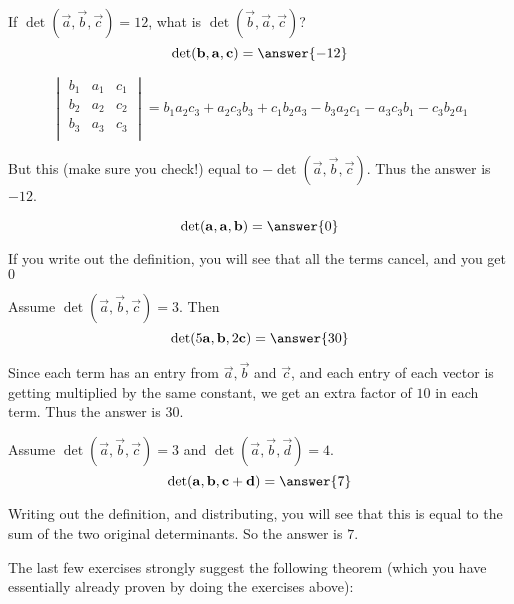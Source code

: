 \documentclass{ximera}
\begin{document}
\begin{question}
  If $\det(\vec{a},\vec{b},\vec{c}) = 12$, what is
  $\det(\vec{b},\vec{a},\vec{c})$?
  \[
  \det(\vec{b},\vec{a},\vec{c}) = \answer{-12}
  \]
  \begin{hint}
    \[
    \begin{vmatrix} 
      b_1 & a_1 & c_1\\
      b_2 & a_2 & c_2\\
      b_3 & a_3 & c_3\\
    \end{vmatrix}
    =b_1a_2c_3+a_2c_3b_3+c_1b_2a_3-b_3a_2c_1-a_3c_3b_1-c_3b_2a_1
    \]
    
    But this (make sure you check!) equal to
    $-\det(\vec{a},\vec{b},\vec{c})$.  Thus the answer is $-12$.
  \end{hint}
\end{question}

\begin{question}
  \[
  \det(\vec{a},\vec{a},\vec{b}) = \answer{0}
  \]
  \begin{hint}
    If you write out the definition, you will see that all the terms cancel, and you get $0$
  \end{hint}
\end{question}
	
\begin{question}
  Assume $\det(\vec{a},\vec{b},\vec{c}) = 3$.  Then 
  \[
  \det(5\vec{a},\vec{b},2\vec{c}) = \answer{30}
  \]
  \begin{hint}
    Since each term has an entry from $\vec{a},\vec{b}$ and $\vec{c}$,
    and each entry of each vector is getting multiplied by the same
    constant, we get an extra factor of $10$ in each term.  Thus the
    answer is $30$.
  \end{hint}
\end{question}

\begin{question}
  Assume $\det(\vec{a},\vec{b},\vec{c}) = 3$ and
  $\det(\vec{a},\vec{b},\vec{d}) = 4$.
  \[
  \det(\vec{a},\vec{b},\vec{c}+\vec{d}) = \answer{7}
  \]
  
  \begin{hint}
    Writing out the definition, and distributing, you will see that
    this is equal to the sum of the two original determinants.  So the
    answer is $7$.
  \end{hint}
\end{question}

The last few exercises strongly suggest the following theorem (which you have essentially already proven by doing the exercises above):
	
\end{document}
